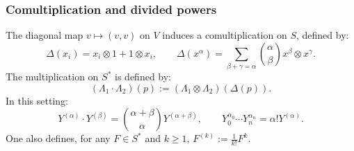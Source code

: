 \documentclass[a4paper,11p]{amsart}
\newcommand{\K}{\mathbb K}
\begin{document}

\subsubsection{Comultiplication and divided powers}

The diagonal map $ v \mapsto (v,v) $ on $ V $ induces a comultiplication on $ S $, defined by:
\[
\Delta(x_i) = x_i \otimes 1 + 1 \otimes x_i, \qquad
\Delta(x^\alpha) = \sum_{\beta + \gamma = \alpha} \binom{\alpha}{\beta} x^\beta \otimes x^\gamma.
\]
The multiplication on $ S^* $ is defined by:
\[
(\Lambda_1 \cdot \Lambda_2)(p) := (\Lambda_1 \otimes \Lambda_2)(\Delta(p)).
\]
In this setting:
\[
Y^{(\alpha)} \cdot Y^{(\beta)} = \binom{\alpha + \beta}{\alpha} Y^{(\alpha + \beta)}, \qquad
Y_0^{\alpha_0} \cdots Y_n^{\alpha_n} = \alpha! Y^{(\alpha)}.
\]
One also defines, for any $ F \in S^* $ and $ k \geq 1 $,
$F^{(k)} := \frac{1}{k!} F^k$.
\end{document}
